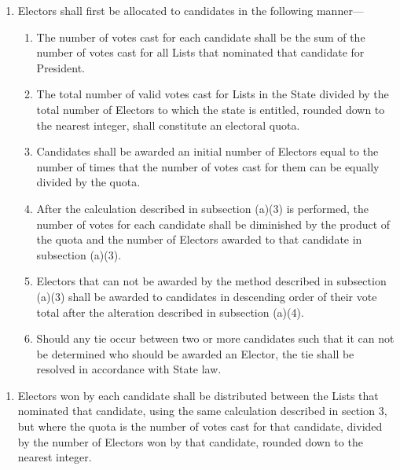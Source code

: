 \documentclass{article}
\begin{document}
    \begin{enumerate}
        \item Electors shall first be allocated to candidates in the following manner---
        \begin{enumerate}
            \item The number of votes cast for each candidate shall be the sum of the number of votes cast for all Lists that nominated that candidate for President.
            \item The total number of valid votes cast for Lists in the State divided by the total number of Electors to which the state is entitled, rounded down to the nearest integer, shall constitute an electoral quota.
            \item Candidates shall be awarded an initial number of Electors equal to the number of times that the number of votes cast for them can be equally divided by the quota.
            \item After the calculation described in subsection (a)(3) is performed, the number of votes for each candidate shall be diminished by the product of the quota and the number of Electors awarded to that candidate in subsection (a)(3).
            \item Electors that can not be awarded by the method described in subsection (a)(3) shall be awarded to candidates in descending order of their vote total after the alteration described in subsection (a)(4).
            \item Should any tie occur between two or more candidates such that it can not be determined who should be awarded an Elector, the tie shall be resolved in accordance with State law.
        \end{enumerate}
    \end{enumerate}
    \begin{enumerate}
        \item Electors won by each candidate shall be distributed between the Lists that nominated that candidate, using the same calculation described in section 3, but where the quota is the number of votes cast for that candidate, divided by the number of Electors won by that candidate, rounded down to the nearest integer.  
    \end{enumerate}
\end{document}
